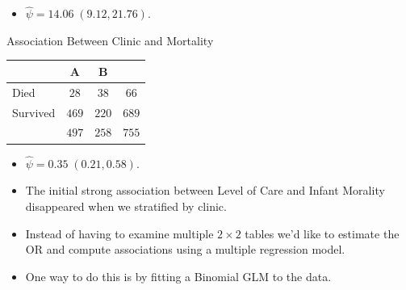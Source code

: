 \documentclass{article}\usepackage[]{graphicx}\usepackage[svgnames]{xcolor}
\newcommand{\OR}{\text{OR}}%
\begin{document}
\begin{itemize}
    \item $ \hat{\psi}=14.06\;(9.12,21.76) $.
\end{itemize}
\begin{Example}{Association Between Clinic and Mortality}
    \begin{center}
        \begin{NiceTabular}{l|cc|c}
            & A                            & B &                                         \\
            \midrule
            Died & $ 28 $                            & $ 38 $                 & $ 66 $         \\
            Survived   & $ 469 $                            & $ 220 $                 & $ 689 $         \\
            \midrule
            & $ 497 $                    & $ 258 $ & $ 755 $
        \end{NiceTabular}
    \end{center}
\end{Example}
\begin{itemize}
    \item $ \hat{\psi}=0.35\;(0.21,0.58) $.
\end{itemize}
\begin{itemize}
    \item The initial strong association between Level of Care and Infant Morality
          disappeared when we stratified by clinic.
          \begin{figure}[!htbp]
              \centering
          \end{figure}
    \item Instead of having to examine multiple $ 2\times 2 $ tables we'd like to estimate the $ \OR $
          and compute associations using a multiple regression model.
    \item One way to do this is by fitting a Binomial GLM to the data.
\end{itemize}
\end{document}
